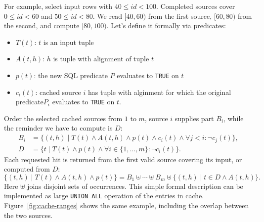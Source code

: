 For example, select input rows with $40\leq id<100$. Completed sources cover
$0\leq id<60$ and $50\leq id<80$. We read $[40,60)$ from the first source,
$[60,80)$ from the second, and compute $[80,100)$.
Let's define it formally via predicates:
\begin{itemize}
  \item $T(t)$: $t$ is an input tuple
  \item $A(t,h)$: $h$ is tuple with alignment of tuple $t$
  \item $p(t)$: the new SQL predicate $P$ evaluates to \texttt{TRUE} on $t$
  \item $c_i(t)$: cached source $i$ has tuple with alginment for which the original predicate$P_i$ evaluates to \texttt{TRUE} on $t$.
\end{itemize}
Order the selected cached sources from $1$ to $m$, source $i$ supplies part $B_i$, while the reminder we have to compute is $D$:
\begin{align}
 B_i &= \{(t,h)\mid T(t)\land A(t,h)\land p(t)\land c_i(t)
                     \land \forall j<i:\neg c_j(t)\},
                     \label{eq:cache-branch}\\
 D &= \{t\mid T(t)\land p(t)\land \forall i\in\{1,\ldots,m\}:\neg c_i(t)\}.
                     \label{eq:cache-difference}
\end{align}
Each requested hit is returned from the first valid source covering its
input, or computed from $D$:
\begin{equation}
 \{(t,h)\mid T(t)\land A(t,h)\land p(t)\}
   = B_1\uplus\cdots\uplus B_m
     \uplus\{(t,h)\mid t\in D\land A(t,h)\}.
 \label{eq:cache-result}
\end{equation}
Here $\uplus$ joins disjoint sets of occurrences. This simple formal description can be implemented as large \texttt{UNION ALL} operation of the entries in cache.
Figure~\ref{fig:cache-ranges} shows the same example, including the overlap
between the two sources.

